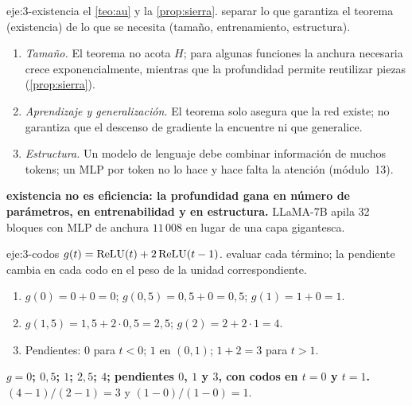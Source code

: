 \begin{solucion}{eje:3-existencia}
\datos el \cref{teo:au} y la \cref{prop:sierra}.
\planteamiento separar lo que garantiza el teorema (existencia) de lo que se necesita (tamaño, entrenamiento, estructura).
\pasos
\begin{enumerate}[label=\arabic*.]
  \item \emph{Tamaño.} El teorema no acota $H$; para algunas funciones la anchura necesaria crece exponencialmente, mientras que la profundidad permite reutilizar piezas (\cref{prop:sierra}).
  \item \emph{Aprendizaje y generalización.} El teorema solo asegura que la red existe; no garantiza que el descenso de gradiente la encuentre ni que generalice.
  \item \emph{Estructura.} Un modelo de lenguaje debe combinar información de muchos tokens; un MLP por token no lo hace y hace falta la atención (módulo~13).
\end{enumerate}
\resultado \textbf{existencia no es eficiencia: la profundidad gana en número de parámetros, en entrenabilidad y en estructura.}
\comprobacion LLaMA-7B apila 32 bloques con MLP de anchura $11\,008$ en lugar de una capa gigantesca.
\end{solucion}

\begin{solucion}{eje:3-codos}
\datos $g(t)=\operatorname{ReLU}(t)+2\operatorname{ReLU}(t-1)$.
\planteamiento evaluar cada término; la pendiente cambia en cada codo en el peso de la unidad correspondiente.
\pasos
\begin{enumerate}[label=\arabic*.]
  \item $g(0)=0+0=0$; $g(0{,}5)=0{,}5+0=0{,}5$; $g(1)=1+0=1$.
  \item $g(1{,}5)=1{,}5+2\cdot 0{,}5=2{,}5$; $g(2)=2+2\cdot 1=4$.
  \item Pendientes: $0$ para $t<0$; $1$ en $(0,1)$; $1+2=3$ para $t>1$.
\end{enumerate}
\resultado \textbf{$g=0$; $0{,}5$; $1$; $2{,}5$; $4$; pendientes $0$, $1$ y $3$, con codos en $t=0$ y $t=1$.}
\comprobacion $(4-1)/(2-1)=3$ y $(1-0)/(1-0)=1$.
\end{solucion}

